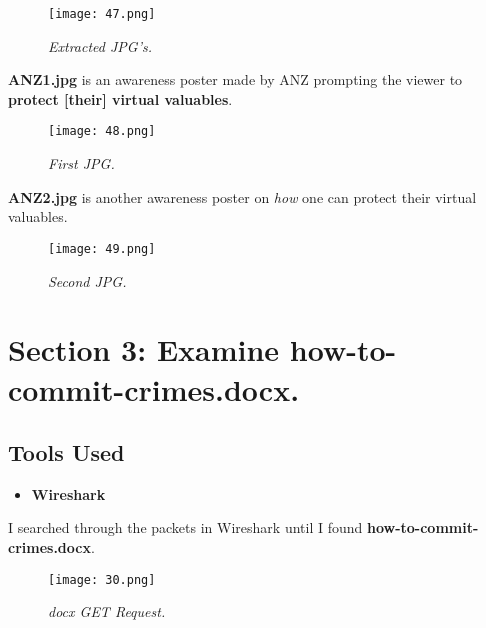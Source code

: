 \begin{figure}[H]
    \setlength{\abovecaptionskip}{20pt}
    \setlength{\belowcaptionskip}{0pt}
    \centering
    \texttt{[image: 47.png]}
    \captionsetup{justification=centering}
    \caption{\textit{Extracted JPG's.}}
    \label{fig:47}
\end{figure}
\vspace{-10pt}

\textbf{ANZ1.jpg} is an awareness poster made by ANZ prompting the viewer to \textbf{protect [their] virtual valuables}.

\begin{figure}[H]
    \setlength{\abovecaptionskip}{20pt}
    \setlength{\belowcaptionskip}{0pt}
    \centering
    \texttt{[image: 48.png]}
    \captionsetup{justification=centering}
    \caption{\textit{First JPG.}}
    \label{fig:48}
\end{figure}
\vspace{-10pt}

\textbf{ANZ2.jpg} is another awareness poster on \textit{how} one can protect their virtual valuables.

\begin{figure}[H]
    \setlength{\abovecaptionskip}{20pt}
    \setlength{\belowcaptionskip}{0pt}
    \centering
    \texttt{[image: 49.png]}
    \captionsetup{justification=centering}
    \caption{\textit{Second JPG.}}
    \label{fig:49}
\end{figure}
\vspace{-10pt}

\section{Section 3: Examine \textbf{how-to-commit-crimes.docx}.}
\subsection{Tools Used}
\begin{itemize}
    \item \textbf{Wireshark}
\end{itemize}

I searched through the packets in Wireshark until I found \textbf{how-to-commit-crimes.docx}. 

\begin{figure}[H]
    \setlength{\abovecaptionskip}{20pt}
    \setlength{\belowcaptionskip}{0pt}
    \centering
    \texttt{[image: 30.png]}
    \captionsetup{justification=centering}
    \caption{\textit{docx GET Request.}}
    \label{fig:30}
\end{figure}
\vspace{-10pt}

